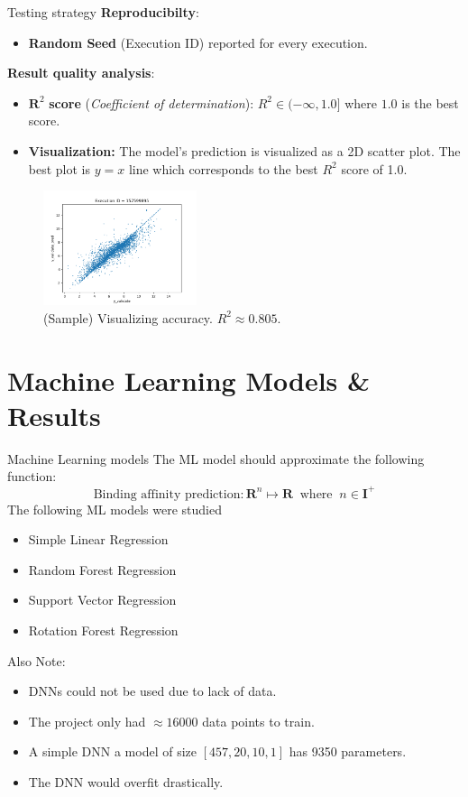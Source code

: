 \documentclass{beamer}
\begin{document}
\begin{frame}[t]{Testing strategy}
\textbf{Reproducibilty}:
\begin{itemize}
\item \textbf{Random Seed} (Execution ID) reported for every execution.
\end{itemize}

\textbf{Result quality analysis}:
\begin{itemize}
\item $\mathbf{R}^2$ \textbf{score} (\textit{Coefficient of determination}): $R^2  \in (- \infty, 1.0]$ where $1.0$ is the best score. 
\item \textbf{Visualization:}
The model's prediction is visualized as a 2D scatter plot. 
The best plot is $y = x$ line which corresponds to the best $R^2$ score of 1.0.

\end{itemize}

\begin{figure}[htb]
  \centering
    \includegraphics[width=0.40\textwidth]{images/accuracy_validate}
    \caption{(Sample) Visualizing accuracy.  $R^2 \approx 0.805$.}
    \label{fig:modelQualityVisualization}
\end{figure}

\end{frame}

\section{Machine Learning Models \& Results}
\begin{frame}[t]{Machine Learning models}
The ML model should approximate the following function:
$$ \textrm{Binding affinity prediction} : \mathbf{R}^n \mapsto \mathbf{R} \;\; \textrm{where} \;\; n \in \mathbf{I}^+$$
The following ML models were studied
\begin{itemize}
\item Simple Linear Regression
\item Random Forest Regression
\item Support Vector Regression
\item Rotation Forest Regression
\end{itemize}
Also Note:
\begin{itemize}
\item DNNs could not be used due to lack of data.  
\item The project only had $\approx 16000$ data points to train.
\item A simple DNN a model of size $[457,  20, 10,  1]$ has 9350 parameters.
\item The DNN would overfit drastically.
\end{itemize}

\end{frame}
\end{document}
